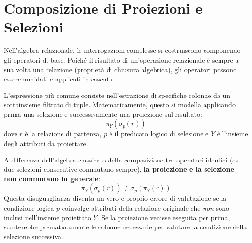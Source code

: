 \section{Composizione di Proiezioni e Selezioni}

Nell'algebra relazionale, le interrogazioni complesse si costruiscono componendo gli operatori di base. Poiché il risultato di un'operazione relazionale è sempre a sua volta una relazione (proprietà di chiusura algebrica), gli operatori possono essere annidati e applicati in cascata.

L'espressione più comune consiste nell'estrazione di specifiche colonne da un sottoinsieme filtrato di tuple. Matematicamente, questo si modella applicando prima una selezione e successivamente una proiezione sul risultato:
$$ \pi_Y(\sigma_p(r)) $$
dove $r$ è la relazione di partenza, $p$ è il predicato logico di selezione e $Y$ è l'insieme degli attributi da proiettare.

A differenza dell'algebra classica o della composizione tra operatori identici (es. due selezioni consecutive commutano sempre), \textbf{la proiezione e la selezione non commutano in generale}:
$$ \pi_Y(\sigma_p(r)) \neq \sigma_p(\pi_Y(r)) $$
Questa disuguaglianza diventa un vero e proprio errore di valutazione se la condizione logica $p$ coinvolge attributi della relazione originale che \textit{non} sono inclusi nell'insieme proiettato $Y$. Se la proiezione venisse eseguita per prima, scarterebbe prematuramente le colonne necessarie per valutare la condizione della selezione successiva.

